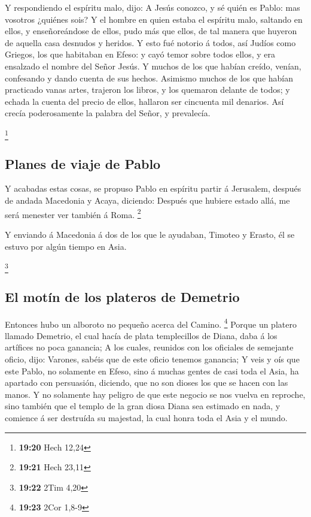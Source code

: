  Y respondiendo el espíritu malo, dijo: A Jesús conozco, y
sé quién es Pablo: mas vosotros ¿quiénes sois?  Y el hombre
en quien estaba el espíritu malo, saltando en ellos, y enseñoreándose de
ellos, pudo más que ellos, de tal manera que huyeron de aquella casa
desnudos y heridos.  Y esto fué notorio á todos, así Judíos
como Griegos, los que habitaban en Efeso: y cayó temor sobre todos
ellos, y era ensalzado el nombre del Señor Jesús.  Y muchos
de los que habían creído, venían, confesando y dando cuenta de sus
hechos.  Asimismo muchos de los que habían practicado vanas
artes, trajeron los libros, y los quemaron delante de todos; y echada la
cuenta del precio de ellos, hallaron ser cincuenta mil denarios.
 Así crecía poderosamente la palabra del Señor, y
prevalecía.

\footnote{\textbf{19:20} Hech 12,24}

\hypertarget{planes-de-viaje-de-pablo}{%
\subsection{Planes de viaje de Pablo}\label{planes-de-viaje-de-pablo}}

 Y acabadas estas cosas, se propuso Pablo en espíritu
partir á Jerusalem, después de andada Macedonia y Acaya, diciendo:
Después que hubiere estado allá, me será menester ver también á Roma.
\footnote{\textbf{19:21} Hech 23,11}

 Y enviando á Macedonia á dos de los que le ayudaban,
Timoteo y Erasto, él se estuvo por algún tiempo en Asia.

\footnote{\textbf{19:22} 2Tim 4,20}

\hypertarget{el-motuxedn-de-los-plateros-de-demetrio}{%
\subsection{El motín de los plateros de
Demetrio}\label{el-motuxedn-de-los-plateros-de-demetrio}}

 Entonces hubo un alboroto no pequeño acerca del Camino.
\footnote{\textbf{19:23} 2Cor 1,8-9}  Porque un platero
llamado Demetrio, el cual hacía de plata templecillos de Diana, daba á
los artífices no poca ganancia;  A los cuales, reunidos con
los oficiales de semejante oficio, dijo: Varones, sabéis que de este
oficio tenemos ganancia;  Y veis y oís que este Pablo, no
solamente en Efeso, sino á muchas gentes de casi toda el Asia, ha
apartado con persuasión, diciendo, que no son dioses los que se hacen
con las manos.  Y no solamente hay peligro de que este
negocio se nos vuelva en reproche, sino también que el templo de la gran
diosa Diana sea estimado en nada, y comience á ser destruída su
majestad, la cual honra toda el Asia y el mundo.


